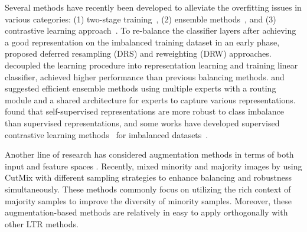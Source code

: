 \documentclass{article}
\renewcommand*\cite[1]{\citep{#1}}
\begin{document}
Several methods have recently been developed to alleviate the overfitting issues in various categories: (1) two-stage training~\cite{cao2019learning, kang2019decoupling, liu2019large}, (2) ensemble methods~\cite{zhou2020bbn, xiang2020learning, wang2021longtailed, cai2021ace}, and (3) contrastive learning approach~\cite{kang2021exploring, cui2021parametric, zhu2022balanced, li2022nested, li2022targeted}. To re-balance the classifier layers after achieving a good representation on the imbalanced training dataset in an early phase, \citet{cao2019learning} proposed deferred resampling (DRS) and reweighting (DRW) approaches. \citet{kang2019decoupling} decoupled the learning procedure into representation learning and training linear classifier, achieved higher performance than previous balancing methods. \citet{wang2021longtailed} and \citet{cai2021ace} suggested efficient ensemble methods using multiple experts with a routing module and a shared architecture for experts to capture various representations. \citet{liu2022selfsupervised} found that self-supervised representations are more robust to class imbalance than supervised representations, and some works have developed supervised contrastive learning methods~\citep{khosla2020supervised} for imbalanced datasets~\citep{cui2021parametric, zhu2022balanced, li2022targeted}.

Another line of research has considered augmentation methods in terms of both input and feature spaces \cite{kim2020m2m, chu2020feature, li2021metasaug}. Recently, \citet{park2022majority} mixed minority and majority images by using CutMix with different sampling strategies to enhance balancing and robustness simultaneously. These methods commonly focus on utilizing the rich context of majority samples to improve the diversity of minority samples. Moreover, these augmentation-based methods are relatively in easy to apply orthogonally with other LTR methods.
\end{document}
